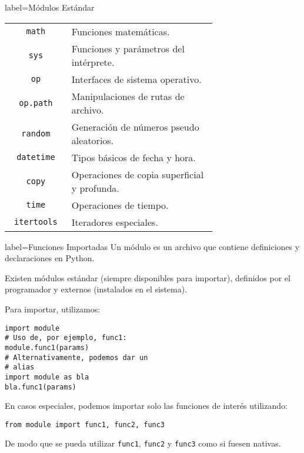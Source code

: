 \begin{contentbox}{label=Módulos Estándar}
    \small
    \begin{tabular}{C|p{0.7\linewidth}}
        \lstinline!math! & Funciones matemáticas. \\
        \lstinline!sys! & Funciones y parámetros del intérprete. \\
        \lstinline!op! & Interfaces de sistema operativo. \\
        \lstinline!op.path! & Manipulaciones de rutas de archivo. \\
        \lstinline!random! & Generación de números pseudo aleatorios. \\
        \lstinline!datetime! & Tipos básicos de fecha y hora. \\
        \lstinline!copy! & Operaciones de copia superficial y profunda. \\
        \lstinline!time! & Operaciones de tiempo. \\
        \lstinline!itertools! & Iteradores especiales.
    \end{tabular}
\end{contentbox}


\begin{contentbox}{label=Funciones Importadas}
    Un módulo es un archivo que contiene definiciones y declaraciones en Python.
    
    Existen módulos estándar (siempre disponibles para importar), definidos por el programador y externos (instalados en el sistema).
    
    Para importar, utilizamos:
    \begin{lstlisting}
import module
# Uso de, por ejemplo, func1:
module.func1(params)
# Alternativamente, podemos dar un 
# alias
import module as bla
bla.func1(params)
    \end{lstlisting}
    
    En casos especiales, podemos importar solo las funciones de interés utilizando:
    \begin{center}
        \lstinline!from module import func1, func2, func3!
    \end{center}
    De modo que se pueda utilizar \verb|func1|, \verb|func2| y \verb|func3| como si fuesen nativas.
\end{contentbox}

